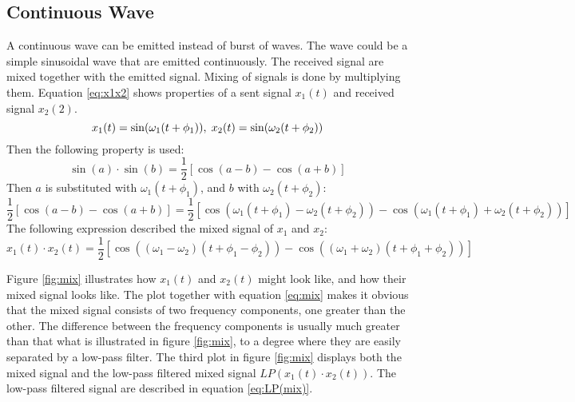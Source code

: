 \subsection{Continuous Wave}
A continuous wave can be emitted instead of burst of waves. The wave could be a simple sinusoidal wave that are emitted continuously. The received signal are mixed together with the emitted signal. Mixing of signals is done by multiplying them. Equation \ref{eq:x1x2} shows properties of a sent signal $x_1(t)$ and received signal $x_2(2)$.
\begin{equation} \label{eq:x1x2}
    x_1(t) = \sin(\omega_{1}(t + \phi_{1})), \hspace{1mm} x_2(t) = \sin(\omega_{2}(t + \phi_{2}))
\end{equation}
Then the following property is used:
\begin{equation} \label{eq:sin*sin}
    \sin(a) \cdot \sin(b) = \frac{1}{2}[\cos(a - b) - \cos(a + b)]
\end{equation}
Then $a$ is substituted with $\omega_{1}(t + \phi_{1})$, and $b$ with $\omega_{2}(t + \phi_{2})$:
\begin{equation} \label{eq:sin*sin}
    \frac{1}{2}[\cos(a - b) - \cos(a + b)] = \frac{1}{2}[\cos(\omega_{1}(t + \phi_{1}) - \omega_{2}(t + \phi_{2})) - \cos(\omega_{1}(t + \phi_{1}) + \omega_{2}(t + \phi_{2}))]
\end{equation}
The following expression described the mixed signal of $x_1$ and $x_2$:
\begin{equation} \label{eq:mix}
    x_1(t) \cdot x_2(t) = \frac{1}{2}[\cos((\omega_{1} - \omega_{2})(t + \phi_{1}-\phi_{2})) - \cos((\omega_{1} + \omega_{2})(t + \phi_{1} + \phi_{2}))]
\end{equation}

Figure \ref{fig:mix} illustrates how $x_1(t)$ and $x_2(t)$ might look like, and how their mixed signal looks like. The plot together with equation \ref{eq:mix} makes it obvious that the mixed signal consists of two frequency components, one greater than the other. The difference between the frequency components is usually much greater than that what is illustrated in figure \ref{fig:mix}, to a degree where they are easily separated by a low-pass filter. The third plot in figure \ref{fig:mix} displays both the mixed signal and the low-pass filtered mixed signal $LP(x_1(t) \cdot x_2(t))$. The low-pass filtered signal are described in equation \ref{eq:LP(mix)}.   

